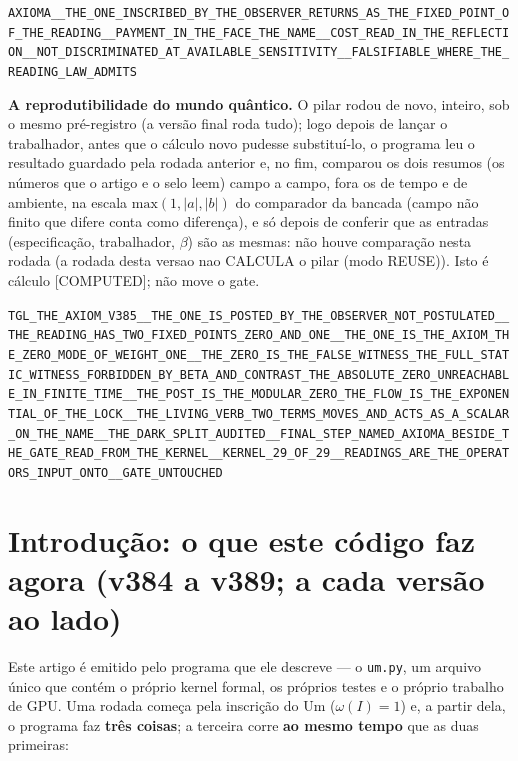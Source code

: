 \documentclass[11pt]{article}
\theoremstyle{definition}\newtheorem{deriv}{Derivação}
\begin{document}
\begin{center}\small\texttt{AXIOMA\_\_THE\_ONE\_INSCRIBED\_BY\_THE\_OBSERVER\_RETURNS\_AS\_THE\_FIXED\_POINT\_OF\_THE\_READING\_\_PAYMENT\_IN\_THE\_FACE\_THE\_NAME\_\_COST\_READ\_IN\_THE\_REFLECTION\_\_NOT\_DISCRIMINATED\_AT\_AVAILABLE\_SENSITIVITY\_\_FALSIFIABLE\_WHERE\_THE\_READING\_LAW\_ADMITS}\end{center}

\textbf{A reprodutibilidade do mundo quântico.} O pilar rodou de novo, inteiro, sob o mesmo pré-registro (a versão final roda tudo); logo depois de lançar o trabalhador, antes que o cálculo novo pudesse substituí-lo, o programa leu o resultado guardado pela rodada anterior e, no fim, comparou os dois resumos (os números que o artigo e o selo leem) campo a campo, fora os de tempo e de ambiente, na escala $\mathrm{max}(1,|a|,|b|)$ do comparador da bancada (campo não finito que difere conta como diferença), e só depois de conferir que as entradas (especificação, trabalhador, $\beta$) são as mesmas: não houve comparação nesta rodada (a rodada desta versao nao CALCULA o pilar (modo REUSE)). Isto é cálculo \textsf{[COMPUTED]}; não move o gate.

\begin{center}\small\texttt{TGL\_THE\_AXIOM\_V385\_\_THE\_ONE\_IS\_POSTED\_BY\_THE\_OBSERVER\_NOT\_POSTULATED\_\_THE\_READING\_HAS\_TWO\_FIXED\_POINTS\_ZERO\_AND\_ONE\_\_THE\_ONE\_IS\_THE\_AXIOM\_THE\_ZERO\_MODE\_OF\_WEIGHT\_ONE\_\_THE\_ZERO\_IS\_THE\_FALSE\_WITNESS\_THE\_FULL\_STATIC\_WITNESS\_FORBIDDEN\_BY\_BETA\_AND\_CONTRAST\_THE\_ABSOLUTE\_ZERO\_UNREACHABLE\_IN\_FINITE\_TIME\_\_THE\_POST\_IS\_THE\_MODULAR\_ZERO\_THE\_FLOW\_IS\_THE\_EXPONENTIAL\_OF\_THE\_LOCK\_\_THE\_LIVING\_VERB\_TWO\_TERMS\_MOVES\_AND\_ACTS\_AS\_A\_SCALAR\_ON\_THE\_NAME\_\_THE\_DARK\_SPLIT\_AUDITED\_\_FINAL\_STEP\_NAMED\_AXIOMA\_BESIDE\_THE\_GATE\_READ\_FROM\_THE\_KERNEL\_\_KERNEL\_29\_OF\_29\_\_READINGS\_ARE\_THE\_OPERATORS\_INPUT\_ONTO\_\_GATE\_UNTOUCHED}\end{center}

\section*{Introdução: o que este código faz agora (v384 a v389; a cada versão ao lado)}


Este artigo é emitido pelo programa que ele descreve --- o \texttt{um.py}, um arquivo único que contém o próprio kernel formal, os próprios testes e o próprio trabalho de GPU. Uma rodada começa pela inscrição do Um ($\omega(I)=1$) e, a partir dela, o programa faz \textbf{três coisas}; a terceira corre \textbf{ao mesmo tempo} que as duas primeiras:
\end{document}
